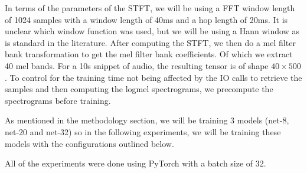 \documentclass[logo,bsc,singlespacing,parskip,online]{infthesis}
\begin{document}
In terms of the parameters of the STFT, we will be using a FFT window length of 1024 samples with a window length of 40ms and a hop length of 20ms. It is 
unclear which window function was used, but we will be using a Hann window as is standard in the literature.
After computing the STFT, we then do a mel filter bank transformation to get the mel filter bank coefficients. 
Of which we extract 40 mel bands. For a 10s snippet of audio, the resulting tensor is of shape $40 \times 500$.
To control for the training time not being affected by the IO 
calls to retrieve the samples and then computing the logmel spectrograms,
we precompute the spectrograms before training.

As mentioned in the methodology section, we will be training 3 models 
(net-8, net-20 and net-32) so in the following experiments, we will 
be training these models with the configurations outlined below.

All of the experiments were done using PyTorch with a batch size of 32.
\end{document}
